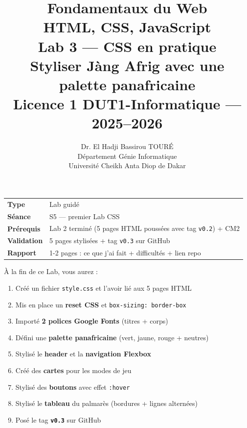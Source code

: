 \documentclass[11pt,a4paper]{article}
\title{%
\vspace{-1cm}
\textbf{\LARGE Fondamentaux du Web}\\
\textbf{\LARGE HTML, CSS, JavaScript}\\[0.8cm]
\textbf{\huge Lab 3 --- CSS en pratique}\\[0.3cm]
\textbf{\Large Styliser Jàng Afrig avec une palette panafricaine}\\[0.5cm]
\large Licence 1 DUT1-Informatique --- 2025--2026}
\author{Dr. El Hadji Bassirou TOURÉ\\
Département Génie Informatique\\
Université Cheikh Anta Diop de Dakar}
\date{}
\begin{document}
\maketitle
\thispagestyle{empty}

\vspace{0.5cm}

\begin{prereqbox}
\begin{center}
\begin{tabular}{ll}
\toprule
\textbf{Type} & Lab guidé \\
\textbf{Séance} & S5 --- premier Lab CSS \\
\textbf{Prérequis} & Lab 2 terminé (5 pages HTML poussées avec tag \texttt{v0.2}) + CM2 \\
\textbf{Validation} & 5 pages stylisées + tag \texttt{v0.3} sur GitHub \\
\textbf{Rapport} & 1-2 pages : ce que j'ai fait + difficultés + lien repo \\
\bottomrule
\end{tabular}
\end{center}
\end{prereqbox}

\begin{objectifbox}
À la fin de ce Lab, vous aurez :
\begin{enumerate}[nosep]
    \item Créé un fichier \texttt{style.css} et l'avoir lié aux 5 pages HTML
    \item Mis en place un \textbf{reset CSS} et \texttt{box-sizing: border-box}
    \item Importé \textbf{2 polices Google Fonts} (titres + corps)
    \item Défini une \textbf{palette panafricaine} (vert, jaune, rouge + neutres)
    \item Stylisé le \textbf{header} et la \textbf{navigation Flexbox}
    \item Créé des \textbf{cartes} pour les modes de jeu
    \item Stylisé des \textbf{boutons} avec effet \texttt{:hover}
    \item Stylisé le \textbf{tableau} du palmarès (bordures + lignes alternées)
    \item Posé le tag \textbf{\texttt{v0.3}} sur GitHub
\end{enumerate}
\end{objectifbox}
\end{document}
